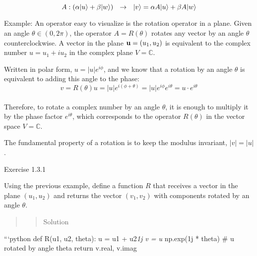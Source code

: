 \documentclass[11pt]{article}
\begin{document}
\[
A: (\alpha|u\rangle + \beta|w\rangle)~~\to ~~ |v\rangle = \alpha A|u\rangle + \beta A|w\rangle
\]

    

    Example: An operator easy to visualize is the rotation operator in a
plane. Given an angle \(\theta \in (0,2\pi)\), the operator
\(A = R(\theta)\) rotates any vector by an angle \(\theta\)
counterclockwise. A vector in the plane \({\bf u} = (u_1, u_2)\) is
equivalent to the complex number \(u = u_1 + i u_2\) in the complex
plane \(V = \mathbb{C}\).

Written in polar form, \(u = |u| e^{i\phi}\), and we know that a
rotation by an angle \(\theta\) is equivalent to adding this angle to
the phase: \[
v = R(\theta) u = |u| e^{i(\phi + \theta)} = |u| e^{i\phi} e^{i\theta} = u \cdot e^{i\theta}
\] \\
Therefore, to rotate a complex number by an angle \(\theta\), it is
enough to multiply it by the phase factor \(e^{i\theta}\), which
corresponds to the operator \(R(\theta)\) in the vector space
\(V = \mathbb{C}\).

The fundamental property of a rotation is to keep the modulus invariant,
\(|v| = |u|\).

    Exercise 1.3.1

Using the previous example, define a function \(R\) that receives a
vector in the plane \((u_1,u_2)\) and returns the vector \((v_1,v_2)\)
with components rotated by an angle \(\theta\).

\begin{quote}
\begin{quote}
Solution
\end{quote}
\end{quote}

```python def R(u1, u2, theta): u = u1 + u2\emph{1j v = u } np.exp(1j *
theta) \# u rotated by angle theta return v.real, v.imag
\end{document}
